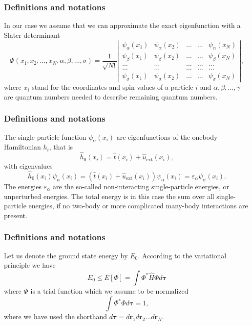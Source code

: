 \documentclass{beamer}
\begin{document}
\begin{frame}
\frametitle{Definitions and notations}

\begin{block}{}
In our case we assume that  we can approximate the exact eigenfunction with a Slater determinant
\begin{equation}
   \Phi(x_1, x_2,\dots ,x_N,\alpha,\beta,\dots, \sigma)=\frac{1}{\sqrt{N!}}
\left| \begin{array}{ccccc} \psi_{\alpha}(x_1)& \psi_{\alpha}(x_2)& \dots & \dots & \psi_{\alpha}(x_N)\\
                            \psi_{\beta}(x_1)&\psi_{\beta}(x_2)& \dots & \dots & \psi_{\beta}(x_N)\\  
                            \dots & \dots & \dots & \dots & \dots \\
                            \dots & \dots & \dots & \dots & \dots \\
                     \psi_{\sigma}(x_1)&\psi_{\sigma}(x_2)& \dots & \dots & \psi_{\sigma}(x_N)\end{array} \right|, \label{eq:HartreeFockDet}
\end{equation}
where  $x_i$  stand for the coordinates and spin values of a particle $i$ and $\alpha,\beta,\dots, \gamma$ 
are quantum numbers needed to describe remaining quantum numbers.  
\end{block}
\end{frame}

\begin{frame}
\frametitle{Definitions and notations}

\begin{block}{}
The single-particle function $\psi_{\alpha}(x_i)$  are eigenfunctions of the onebody
Hamiltonian $h_i$, that is
\[
\hat{h}_0(x_i)=\hat{t}(x_i) + \hat{u}_{\mathrm{ext}}(x_i),
\]
with eigenvalues 
\[
\hat{h}_0(x_i) \psi_{\alpha}(x_i)=\left(\hat{t}(x_i) + \hat{u}_{\mathrm{ext}}(x_i)\right)\psi_{\alpha}(x_i)=\varepsilon_{\alpha}\psi_{\alpha}(x_i).
\]
The energies $\varepsilon_{\alpha}$ are the so-called non-interacting single-particle energies, or unperturbed energies. 
The total energy is in this case the sum over all  single-particle energies, if no two-body or more complicated
many-body interactions are present.
\end{block}
\end{frame}

\begin{frame}
\frametitle{Definitions and notations}

\begin{block}{}
Let us denote the ground state energy by $E_0$. According to the
variational principle we have
\[
  E_0 \le E[\Phi] = \int \Phi^*\hat{H}\Phi d\mathbf{\tau}
\]
where $\Phi$ is a trial function which we assume to be normalized
\[
  \int \Phi^*\Phi d\mathbf{\tau} = 1,
\]
where we have used the shorthand $d\mathbf{\tau}=d\mathbf{r}_1d\mathbf{r}_2\dots d\mathbf{r}_N$.
\end{block}
\end{frame}
\end{document}

